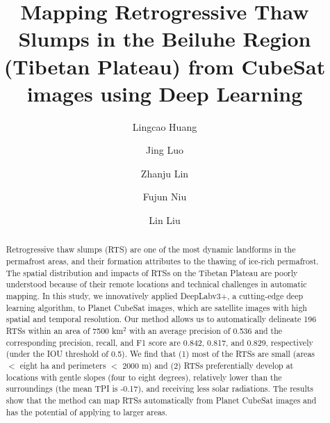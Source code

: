 \documentclass[preprint,12pt,authoryear]{elsarticle}
\begin{document}
\begin{frontmatter}




\title{Mapping Retrogressive Thaw Slumps in the Beiluhe Region (Tibetan Plateau) from CubeSat images using Deep Learning}


\author[a]{Lingcao Huang}
\author[b]{Jing Luo}
\author[b]{Zhanju Lin}
\author[b]{Fujun Niu}
\author[a]{Lin Liu}


\address[a]{Earth System Science Programme, Faculty of Science, The Chinese University of Hong Kong, Hong Kong SAR, China.}
\address[b]{Northwest Institute of Eco-Environment and Resources, Chinese Academy of Sciences, LanZhou, China.}

\begin{abstract}

Retrogressive thaw slumps (RTS) are one of the most dynamic landforms in the permafrost areas, and their formation attributes to the thawing of ice-rich permafrost. The spatial distribution and impacts of RTSs on the Tibetan Plateau are poorly understood because of their remote locations and technical challenges in automatic mapping. In this study, we innovatively applied DeepLabv3+, a cutting-edge deep learning algorithm, to Planet CubeSat images, which are satellite images with high spatial and temporal resolution.  Our method allows us to automatically delineate 196 RTSs within an area of 7500 km$^2$ with an average precision of 0.536 and the corresponding precision, recall, and F1 score are 0.842, 0.817, and 0.829, respectively (under the IOU threshold of 0.5). We find that (1) most of the RTSs are small (areas $<$ eight ha and perimeters $<$ 2000 m)  and (2) RTSs preferentially develop at locations with gentle slopes (four to eight degrees), relatively lower than the surroundings (the mean TPI is -0.17), and receiving less solar radiations. The results show that the method can map RTSs automatically from Planet CubeSat images and has the potential of applying to larger areas.



\end{abstract}
\end{frontmatter}
\end{document}
